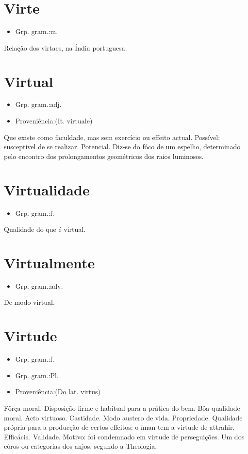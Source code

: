 \documentclass{article}
\begin{document}
\section{Virte}
\begin{itemize}
\item {Grp. gram.:m.}
\end{itemize}
Relação dos virtaes, na Índia portuguesa.
\section{Virtual}
\begin{itemize}
\item {Grp. gram.:adj.}
\end{itemize}
\begin{itemize}
\item {Proveniência:(It. \textunderscore virtuale\textunderscore )}
\end{itemize}
Que existe como faculdade, mas sem exercício ou effeito actual.
Possível; susceptível de se realizar.
Potencial.
Diz-se do fóco de um espelho, determinado pelo encontro dos prolongamentos geométricos dos raios luminosos.
\section{Virtualidade}
\begin{itemize}
\item {Grp. gram.:f.}
\end{itemize}
Qualidade do que é virtual.
\section{Virtualmente}
\begin{itemize}
\item {Grp. gram.:adv.}
\end{itemize}
De modo virtual.
\section{Virtude}
\begin{itemize}
\item {Grp. gram.:f.}
\end{itemize}
\begin{itemize}
\item {Grp. gram.:Pl.}
\end{itemize}
\begin{itemize}
\item {Proveniência:(Do lat. \textunderscore virtus\textunderscore )}
\end{itemize}
Fôrça moral.
Disposição firme e habitual para a prática do bem.
Bôa qualidade moral.
Acto virtuoso.
Castidade.
Modo austero de vida.
Propriedade.
Qualidade própria para a producção de certos effeitos: \textunderscore o íman tem a virtude de attrahir\textunderscore .
Efficácia.
Validade.
Motivo: \textunderscore foi condemnado em virtude de perseguições\textunderscore .
Um dos córos ou categorias dos anjos, segundo a Theologia.
\end{document}
